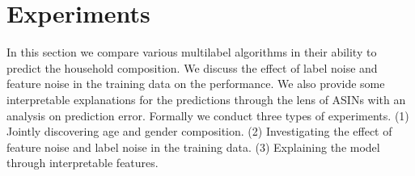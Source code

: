 \section{Experiments}
\label{sec:experiments}
In this section we compare various multilabel algorithms in their ability to predict the household composition. We discuss the effect of label noise and feature noise in the training data on the performance. We also provide some interpretable explanations for the predictions through the lens of ASINs with an analysis on prediction error.  Formally we conduct three types of experiments. (1) Jointly discovering age and gender composition. (2) Investigating the effect of feature noise and label noise in the training data. (3) Explaining the model through interpretable features. 
%
